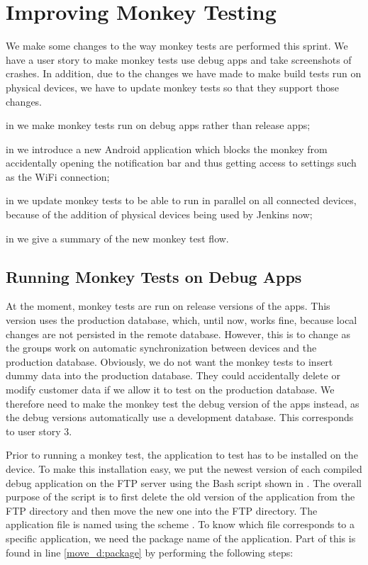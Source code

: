\chapter{Improving Monkey Testing}
We make some changes to the way monkey tests are performed this sprint. We have a user story to make monkey tests use debug apps and take screenshots of crashes. In addition, due to the changes we have made to make build tests run on physical devices, we have to update monkey tests so that they support those changes.

\begin{chapterorganization}
  \item in  we make monkey tests run on debug apps rather than release apps;
  \item in  we introduce a new Android application which blocks the monkey from accidentally opening the notification bar and thus getting access to settings such as the WiFi connection;
  \item in  we update monkey tests to be able to run in parallel on all connected devices, because of the addition of physical devices being used by Jenkins now;
  \item in  we give a summary of the new monkey test flow.
\end{chapterorganization}

\section{Running Monkey Tests on Debug Apps}\label{sec:monkey_test_debug_app}
At the moment, monkey tests are run on release versions of the apps. This version uses the production database, which, until now, works fine, because local changes are not persisted in the remote database. However, this is to change as the \db{} groups work on automatic synchronization between devices and the production database. Obviously, we do not want the monkey tests to insert dummy data into the production database. They could accidentally delete or modify customer data if we allow it to test on the production database. We therefore need to make the monkey test the debug version of the apps instead, as the debug versions automatically use a development database. This corresponds to user story 3.

Prior to running a monkey test, the application to test has to be installed on the device. To make this installation easy, we put the newest version of each compiled debug application on the FTP server using the Bash script shown in . The overall purpose of the script is to first delete the old version of the application from the FTP directory and then move the new one into the FTP directory. The application file is named using the scheme . To know which file corresponds to a specific application, we need the package name of the application. Part of this is found in line \ref{move_d:package} by performing the following steps:

